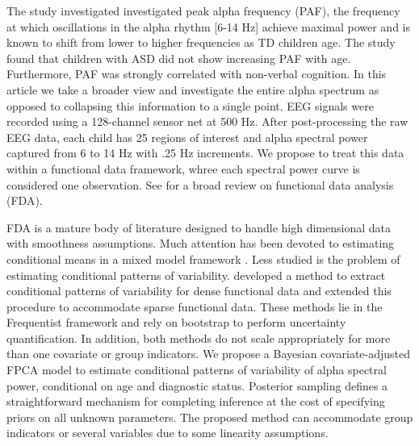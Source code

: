 \documentclass[useAMS,usenatbib]{biom}
\begin{document}
The study investigated investigated peak alpha frequency (PAF), the frequency at which oscillations in the alpha rhythm [6-14 Hz] achieve maximal power and is known to shift from lower to higher frequencies as TD children age. The study found that children with ASD did not show increasing PAF with age. Furthermore, PAF was strongly correlated with non-verbal cognition. In this article we take a broader view and investigate the entire alpha spectrum as opposed to collapsing this information to a single point. EEG signals were recorded using a 128-channel sensor net at 500 Hz. After post-processing the raw EEG data, each child has 25 regions of interest and alpha spectral power captured from 6 to 14 Hz with .25 Hz increments. We propose to treat this data within a functional data framework, whree each spectral power curve is considered one observation. See \cite{Wang2016} for a broad review on functional data analysis (FDA). 

FDA is a mature body of literature designed to handle high dimensional data with smoothness assumptions. Much attention has been devoted to estimating conditional means in a mixed model framework \citep{Guo2002, Morris2006, Montagna2012}. Less studied is the problem of estimating conditional patterns of variability. \cite{Cardot2007} developed a method to extract conditional patterns of variability for dense functional data and \cite{Jiang2010} extended this procedure to accommodate sparse functional data. These methods lie in the Frequentist framework and rely on bootstrap to perform uncertainty quantification. In addition, both methods do not scale appropriately for more than one covariate or group indicators. We propose a Bayesian covariate-adjusted FPCA model to estimate conditional patterns of variability of alpha spectral power, conditional on age and diagnostic status. Posterior sampling defines a straightforward mechanism for completing inference at the cost of specifying priors on all unknown parameters. The proposed method can accommodate group indicators or several variables due to some linearity assumptions. 
\end{document}
